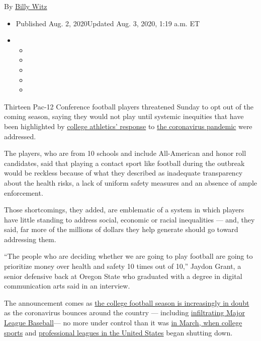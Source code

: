 By \href{https://www.nytimes.com/by/billy-witz}{Billy Witz}

\begin{itemize}
\item
  Published Aug. 2, 2020Updated Aug. 3, 2020, 1:19 a.m. ET
\item
  \begin{itemize}
  \item
  \item
  \item
  \item
  \item
  \end{itemize}
\end{itemize}

Thirteen Pac-12 Conference football players threatened Sunday to opt out
of the coming season, saying they would not play until systemic
inequities that have been highlighted by
\href{https://www.nytimes.com/2020/07/16/sports/ncaafootball/ncaa-guidelines-fall-sports.html}{college
athletics' response} to
\href{https://www.nytimes.com/news-event/coronavirus}{the coronavirus
pandemic} were addressed.

The players, who are from 10 schools and include All-American and honor
roll candidates, said that playing a contact sport like football during
the outbreak would be reckless because of what they described as
inadequate transparency about the health risks, a lack of uniform safety
measures and an absence of ample enforcement.

Those shortcomings, they added, are emblematic of a system in which
players have little standing to address social, economic or racial
inequalities --- and, they said, far more of the millions of dollars
they help generate should go toward addressing them.

``The people who are deciding whether we are going to play football are
going to prioritize money over health and safety 10 times out of 10,''
Jaydon Grant, a senior defensive back at Oregon State who graduated with
a degree in digital communication arts said in an interview.

The announcement comes as
\href{https://www.nytimes.com/2020/07/10/sports/ncaafootball/coronavirus-college-football-season-canceled.html}{the
college football season is increasingly in doubt} as the coronavirus
bounces around the country --- including
\href{https://www.nytimes.com/2020/08/01/sports/baseball/coronavirus-cardinals.html}{infiltrating
Major League Baseball}--- no more under control than it was
\href{https://www.nytimes.com/2020/03/12/sports/ncaabasketball/ncaa-basketball-tournament-coronavirus.html}{in
March, when college sports} and
\href{https://www.nytimes.com/2020/03/12/sports/coronavirus-sports-canceled.html}{professional
leagues in the United States} began shutting down.

